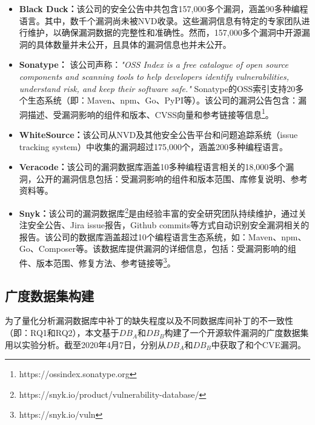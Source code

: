 \begin{itemize}[leftmargin=*]
\item\textbf{Black Duck：}该公司的安全公告中共包含157,000多个漏洞，涵盖90多种编程语言。其中，数千个漏洞尚未被NVD收录。这些漏洞信息有特定的专家团队进行维护，以确保漏洞数据的完整性和准确性。然而，157,000多个漏洞中开源漏洞的具体数量并未公开，且具体的漏洞信息也并未公开。
\item\textbf{Sonatype：} 该公司声称：\textit{"OSS Index is a free catalogue of open source components and scanning tools to help developers identify vulnerabilities, understand risk, and keep their software safe."} Sonatype的OSS索引支持20多个生态系统（即：Maven、npm、Go、PyPI等）。该公司的漏洞公告包含：漏洞描述、受漏洞影响的组件和版本、CVSS向量和参考链接等信息\footnote{https://ossindex.sonatype.org}。
\item\textbf{WhiteSource：}该公司从NVD及其他安全公告平台和问题追踪系统（issue tracking system）中收集的漏洞超过175,000个，涵盖200多种编程语言。
\item\textbf{Veracode：}该公司的漏洞数据库涵盖10多种编程语言相关的18,000多个漏洞，公开的漏洞信息包括：受漏洞影响的组件和版本范围、库修复说明、参考资料等。
\item\textbf{Snyk：}该公司的漏洞数据库\footnote{https://snyk.io/product/vulnerability-database/}是由经验丰富的安全研究团队持续维护，通过关注安全公告、Jira issue报告，Github commits等方式自动识别安全漏洞相关的报告。该公司的数据库涵盖超过10个编程语言生态系统，如：Maven、npm、Go、Composer等。该数据库提供漏洞的详细信息，包括：受漏洞影响的组件、版本范围、修复方法、参考链接等\footnote{https://snyk.io/vuln}。
\end{itemize}



\subsection{广度数据集构建}
为了量化分析漏洞数据库中补丁的缺失程度以及不同数据库间补丁的不一致性（即：RQ1和RQ2），本文基于$DB_A$和$DB_B$构建了一个开源软件漏洞的广度数据集用以实验分析。截至2020年4月7日，分别从$DB_A$和$DB_B$中获取了和个CVE漏洞。

